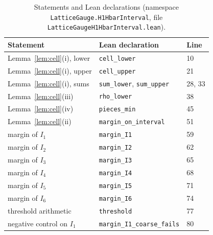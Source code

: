 \documentclass[11pt,a4paper]{article}
\theoremstyle{definition}
\theoremstyle{remark}
\begin{document}
\begin{table}[!htbp]\centering\small
\caption{Statements and Lean declarations (namespace \texttt{LatticeGauge.H1HbarInterval}, file \texttt{LatticeGaugeH1HbarInterval.lean}).}\label{tab:corr}
\begin{tabular}{@{}lll@{}}\toprule
Statement & Lean declaration & Line\\\midrule
Lemma~\ref{lem:cell}(i), lower & \texttt{cell\_lower} & 10\\
Lemma~\ref{lem:cell}(i), upper & \texttt{cell\_upper} & 21\\
Lemma~\ref{lem:cell}(i), sums & \texttt{sum\_lower}, \texttt{sum\_upper} & 28, 33\\
Lemma~\ref{lem:cell}(iii) & \texttt{rho\_lower} & 38\\
Lemma~\ref{lem:cell}(iv) & \texttt{pieces\_min} & 45\\
Lemma~\ref{lem:cell}(ii) & \texttt{margin\_on\_interval} & 51\\
margin of $I_1$ & \texttt{margin\_I1} & 59\\
margin of $I_2$ & \texttt{margin\_I2} & 62\\
margin of $I_3$ & \texttt{margin\_I3} & 65\\
margin of $I_4$ & \texttt{margin\_I4} & 68\\
margin of $I_5$ & \texttt{margin\_I5} & 71\\
margin of $I_6$ & \texttt{margin\_I6} & 74\\
threshold arithmetic & \texttt{threshold} & 77\\
negative control on $I_1$ & \texttt{margin\_I1\_coarse\_fails} & 80\\\bottomrule
\end{tabular}
\end{table}
\end{document}
